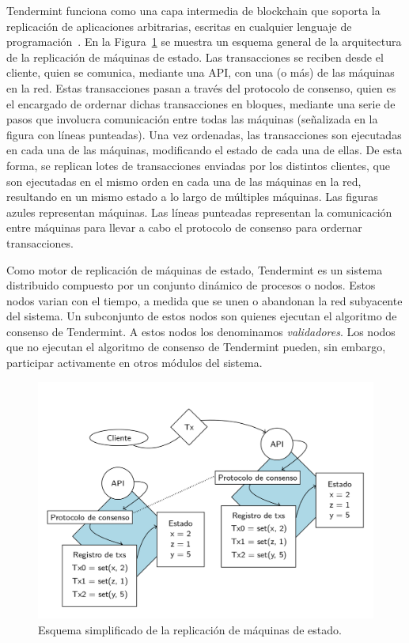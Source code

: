 Tendermint funciona como una capa intermedia de blockchain que soporta la replicación de aplicaciones arbitrarias,
escritas en cualquier lenguaje de programación~\cite{tendermint.design}.
%
En la Figura~\ref{fig:replication} se muestra un esquema general de la arquitectura de la replicación de máquinas de
estado.
%
Las transacciones se reciben desde el cliente, quien se comunica, mediante una API, con una (o más) de las máquinas
en la red.
%
Estas transacciones pasan a través del protocolo de consenso, quien es el encargado de ordernar dichas
transacciones en bloques, mediante una serie de pasos que involucra comunicación entre todas las máquinas
(señalizada en la figura con líneas punteadas).
%
Una vez ordenadas, las transacciones son ejecutadas en cada una de las máquinas, modificando el estado
de cada una de ellas.
%
De esta forma, se replican lotes de transacciones enviadas por los distintos clientes, que son ejecutadas en el mismo
orden en cada una de las máquinas en la red, resultando en un mismo estado a lo largo de múltiples máquinas.
%
Las figuras azules representan máquinas.
%
Las líneas punteadas representan la comunicación entre máquinas para llevar a cabo el protocolo de consenso para ordernar
transacciones.

Como motor de replicación de máquinas de estado, Tendermint es un sistema distribuido compuesto por un conjunto
dinámico de procesos o nodos.
%
Estos nodos varian con el tiempo, a medida que se unen o abandonan la red subyacente del sistema.
%
Un subconjunto de estos nodos son quienes ejecutan el algoritmo de consenso de Tendermint.
%
A estos nodos los denominamos \textit{validadores}.
%
Los nodos que no ejecutan el algoritmo de consenso de Tendermint pueden, sin embargo, participar
activamente en otros módulos del sistema.


\begin{figure}
  \centering
  \includegraphics[scale=0.3]{figures/state-machine-replication.png}
  \caption{Esquema simplificado de la replicación de máquinas de estado.}
  \label{fig:replication}
\end{figure}

